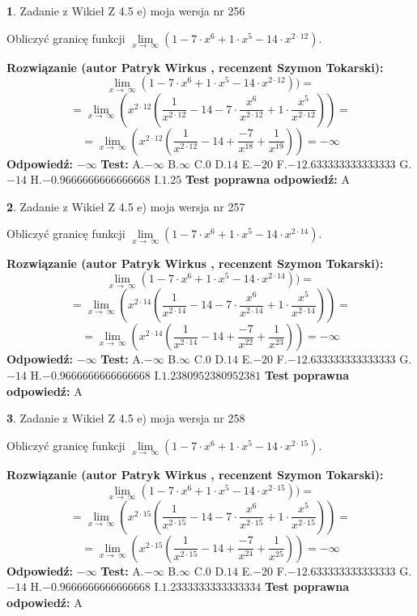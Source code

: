 \documentclass[12pt, a4paper]{article}
\theoremstyle{definition} %
\newtheorem{zad}{}
\newcommand{\zadStart}[1]{\begin{zad}#1\newline}
\newcommand{\zadStop}{\end{zad}}
\newcommand{\rozwStart}[2]{\noindent \textbf{Rozwiązanie (autor #1 , recenzent #2): }\newline}
\newcommand{\rozwStop}{\newline}
\newcommand{\odpStart}{\noindent \textbf{Odpowiedź:}\newline}
\newcommand{\odpStop}{\newline}
\newcommand{\testStart}{\noindent \textbf{Test:}\newline}
\newcommand{\testStop}{\newline}
\newcommand{\kluczStart}{\noindent \textbf{Test poprawna odpowiedź:}\newline}
\newcommand{\kluczStop}{\newline}
\begin{document}
\zadStart{Zadanie z Wikieł Z 4.5 e) moja wersja nr 256}


Obliczyć granicę funkcji  $\lim\limits_{x\to\ \infty}(1 - 7 \cdot x^{6}+1 \cdot x^{5}- 14 \cdot x^{2\cdot12})$.
\zadStop
\rozwStart{Patryk Wirkus}{Szymon Tokarski}
$$\lim\limits_{x\to\ \infty}(1 - 7 \cdot x^{6}+1 \cdot x^{5}- 14 \cdot x^{2\cdot12}))=$$
$$=\lim\limits_{x\to\ \infty}(x^{2\cdot12}(\frac{1}{x^{2\cdot12}}-14 -7 \cdot \frac{x^{6}}{x^{2\cdot12}}+1 \cdot \frac{x^{5}}{x^{2\cdot12}}))=$$
$$=\lim\limits_{x\to\ \infty}(x^{2\cdot12}(\frac{1}{x^{2\cdot12}}-14 + \frac{-7}{x^{18}}+ \frac{1}{x^{19}}))=-\infty$$
\rozwStop
\odpStart
$-\infty$
\odpStop
\testStart
A.$-\infty$ B.$\infty$ C.$0$ D.$14$ E.$-20$
F.$-12.633333333333333$ G.$-14$
H.$-0.9666666666666668$
I.$1.25$
\testStop
\kluczStart
A
\kluczStop



\zadStart{Zadanie z Wikieł Z 4.5 e) moja wersja nr 257}


Obliczyć granicę funkcji  $\lim\limits_{x\to\ \infty}(1 - 7 \cdot x^{6}+1 \cdot x^{5}- 14 \cdot x^{2\cdot14})$.
\zadStop
\rozwStart{Patryk Wirkus}{Szymon Tokarski}
$$\lim\limits_{x\to\ \infty}(1 - 7 \cdot x^{6}+1 \cdot x^{5}- 14 \cdot x^{2\cdot14}))=$$
$$=\lim\limits_{x\to\ \infty}(x^{2\cdot14}(\frac{1}{x^{2\cdot14}}-14 -7 \cdot \frac{x^{6}}{x^{2\cdot14}}+1 \cdot \frac{x^{5}}{x^{2\cdot14}}))=$$
$$=\lim\limits_{x\to\ \infty}(x^{2\cdot14}(\frac{1}{x^{2\cdot14}}-14 + \frac{-7}{x^{22}}+ \frac{1}{x^{23}}))=-\infty$$
\rozwStop
\odpStart
$-\infty$
\odpStop
\testStart
A.$-\infty$ B.$\infty$ C.$0$ D.$14$ E.$-20$
F.$-12.633333333333333$ G.$-14$
H.$-0.9666666666666668$
I.$1.2380952380952381$
\testStop
\kluczStart
A
\kluczStop



\zadStart{Zadanie z Wikieł Z 4.5 e) moja wersja nr 258}


Obliczyć granicę funkcji  $\lim\limits_{x\to\ \infty}(1 - 7 \cdot x^{6}+1 \cdot x^{5}- 14 \cdot x^{2\cdot15})$.
\zadStop
\rozwStart{Patryk Wirkus}{Szymon Tokarski}
$$\lim\limits_{x\to\ \infty}(1 - 7 \cdot x^{6}+1 \cdot x^{5}- 14 \cdot x^{2\cdot15}))=$$
$$=\lim\limits_{x\to\ \infty}(x^{2\cdot15}(\frac{1}{x^{2\cdot15}}-14 -7 \cdot \frac{x^{6}}{x^{2\cdot15}}+1 \cdot \frac{x^{5}}{x^{2\cdot15}}))=$$
$$=\lim\limits_{x\to\ \infty}(x^{2\cdot15}(\frac{1}{x^{2\cdot15}}-14 + \frac{-7}{x^{24}}+ \frac{1}{x^{25}}))=-\infty$$
\rozwStop
\odpStart
$-\infty$
\odpStop
\testStart
A.$-\infty$ B.$\infty$ C.$0$ D.$14$ E.$-20$
F.$-12.633333333333333$ G.$-14$
H.$-0.9666666666666668$
I.$1.2333333333333334$
\testStop
\kluczStart
A
\kluczStop
\end{document}
